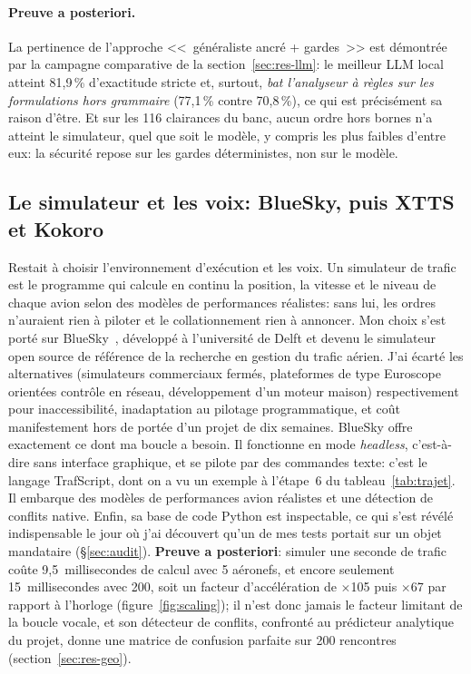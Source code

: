 \documentclass[11pt,a4paper]{article}
\begin{document}
\paragraph{Preuve a posteriori.} La pertinence de l'approche <<~généraliste ancré + gardes~>>
est démontrée par la campagne comparative de la section~\ref{sec:res-llm}: le meilleur LLM
local atteint 81,9\,\% d'exactitude stricte et, surtout, \emph{bat l'analyseur à règles sur
les formulations hors grammaire} (77,1\,\% contre 70,8\,\%), ce qui est précisément sa raison
d'être. Et sur les 116 clairances du banc, aucun ordre hors bornes n'a atteint le simulateur,
quel que soit le modèle, y compris les plus faibles d'entre eux: la sécurité repose sur les
gardes déterministes, non sur le modèle.

\subsection{Le simulateur et les voix: BlueSky, puis XTTS et Kokoro}

Restait à choisir l'environnement d'exécution et les voix. Un simulateur de trafic est le programme qui calcule en continu la position, la vitesse et le niveau de chaque avion selon des modèles de performances réalistes: sans lui, les ordres n'auraient rien à piloter et le collationnement rien à annoncer. Mon choix s'est porté sur BlueSky~\cite{bluesky}, développé à l'université de Delft et devenu le simulateur open source de référence de la recherche en gestion du trafic aérien. J'ai écarté les alternatives (simulateurs commerciaux fermés, plateformes de type Euroscope orientées contrôle en réseau, développement d'un moteur maison) respectivement pour inaccessibilité, inadaptation au pilotage programmatique, et coût manifestement hors de portée d'un projet de dix semaines. BlueSky offre exactement ce dont ma boucle a besoin. Il fonctionne en mode \emph{headless}, c'est-à-dire sans interface graphique, et se pilote par des commandes texte: c'est le langage TrafScript, dont on a vu un exemple à l'étape~6 du tableau~\ref{tab:trajet}. Il embarque des modèles de performances avion réalistes et une détection de conflits native. Enfin, sa base de code Python est inspectable, ce qui s'est révélé indispensable le jour où j'ai découvert qu'un de mes tests portait sur un objet mandataire (\S\ref{sec:audit}). \textbf{Preuve a posteriori}: simuler une seconde de trafic coûte 9,5~millisecondes de calcul avec 5 aéronefs, et encore seulement 15~millisecondes avec 200, soit un facteur d'accélération de $\times$105 puis $\times$67 par rapport à l'horloge (figure~\ref{fig:scaling}); il n'est donc jamais le facteur limitant de la boucle vocale, et son détecteur de conflits, confronté au prédicteur analytique du projet, donne une matrice de confusion parfaite sur 200 rencontres (section~\ref{sec:res-geo}). 
\end{document}
